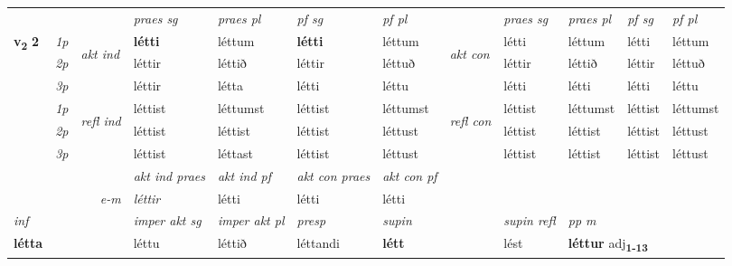 \begin{longtable}[l]{X>{\footnotesize\itshape}llXXXXlXXXX}
 & &   & \textit{praes sg}  & \textit{praes pl}    & \textit{ pf sg} & \textit{pf pl} & & \textit{praes sg}  & \textit{praes pl}    & \textit{pf sg} & \textit{pf pl }  \\ \cmidrule{4-7} \cmidrule{9-12}
 \multirow{2}{*}{{{\textbf{v{\textsubscript{2}}} \Large{\textbf{2}}}}}  & 1p & \multirow{3}{*}{\begin{turn}{90}\textit{akt ind}\end{turn}} & \textbf{létti} & léttum & \textbf{létti} & léttum & \multirow{3}{*}{\begin{turn}{90}\textit{akt con}\end{turn}} &létti & léttum & létti & léttum\\*
 & 2p &  &  léttir  & léttið & léttir & léttuð & & léttir & léttið & léttir & léttuð \\*
 & 3p &  & léttir & létta & létti & léttu & & létti & létti& létti & léttu \\*
\cmidrule{4-7} \cmidrule{9-12}
 & 1p & \multirow{3}{*}{\begin{turn}{90}\textit{refl ind}\end{turn}}  & léttist & léttumst & léttist & léttumst & \multirow{3}{*}{\begin{turn}{90}\textit{refl con}\end{turn}}  &léttist & léttumst & léttist & léttumst \\*
 & 2p &  & léttist & léttist & léttist & léttust & &léttist & léttist & léttist & léttust \\*
 & 3p  & & léttist & léttast & léttist & léttust & & léttist & léttist& léttist & léttust \\*
\cmidrule{4-7} \cmidrule{9-12}

   && &  \textit{akt ind praes} & \textit{akt ind pf} & \textit{akt con praes} & \textit{akt con pf} \\*
\multicolumn{3}{r}{\textit{e-m}} & léttir & létti & létti & létti \\*

\cmidrule{4-7}
   {\textit{inf}} & &  & \textit{imper akt sg} & \textit{imper akt pl}   & \textit{presp} & \textit{supin} && \textit{supin refl} & \textit{pp m} \\*
  {\textbf{létta}} & && léttu  & léttið   & léttandi &  \textbf{létt} && lést & \multicolumn{2}{l}{\textbf{léttur} adj\textbf{\textsubscript{1-13}}} \\*

\midrule


\end{longtable}
